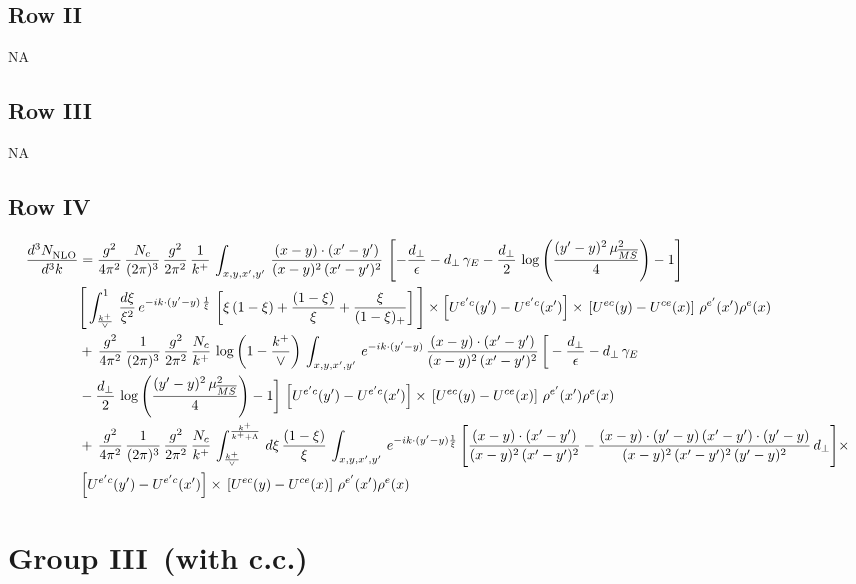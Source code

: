 \documentclass[9pt]{article}
\numberwithin{equation}{section}
\begin{document}
\subsection{Row II}
\textsc{NA}
\subsection{Row III}
\textsc{NA}
\subsection{Row IV}
\begin{align}
    \frac{d^{3}N_{\rm NLO}^{\rm}}{d^{3}k}  & = \frac{g^{2}}{4\pi^{2}}\, \frac{N_{c}}{(2\pi)^{3}}\,\frac{g^{2}}{2\pi^{2}}\, \frac{1}{k^{+}}\,\int_{x,y,x',y'}\,\frac{(x-y)\cdot (x'-y')}{(x-y)^{2}\,(x'-y')^{2}}\,\left[-\frac{d_{\perp}}{\epsilon}-d_{\perp}\,\gamma_{E}-\frac{d_{\perp}}{2}\,\log{\left(\frac{(y'-y)^{2}\,\mu^{2}_{\overline{MS}}}{4}\right)}-1\right]\,\notag \\ & \Bigg[\int_{\frac{k^{+}}{\vee}}^{1}\,\frac{d\xi}{\xi^{2}}\,e^{-ik\cdot (y'-y)\,\frac{1}{\xi}}\,\left[\xi\,(1-\xi)+\frac{(1-\xi)}{\xi}+\frac{\xi}{(1-\xi)_{+}}\right]\Bigg]\times \left[U^{e'c}(y') - U^{e'c}(x')\right] \times\, \left[U^{ec}(y) - U^{ce}(x)\right]\, \rho^{e'}(x') \rho^{e}(x)\notag \\ &  +\, \frac{g^{2}}{4\pi^{2}}\, \frac{1}{(2\pi)^{3}}\,\frac{g^{2}}{2\pi^{2}}\, \frac{N_{c}}{k^{+}}\, \log{\left(1-\frac{k^{+}}{\vee}\right)}\,\int_{x,y,x',y'}\,e^{-ik\cdot (y'-y)}\,\frac{(x-y)\cdot (x'-y')}{(x-y)^{2}\,(x'-y')^{2}}\,\bigg[-\frac{d_{\perp}}{\epsilon}-d_{\perp}\,\gamma_{E}\notag \\ & -\frac{d_{\perp}}{2}\,\log{\left(\frac{(y'-y)^{2}\,\mu^{2}_{\overline{MS}}}{4}\right)}-1\bigg]\,\left[U^{e'c}(y') - U^{e'c}(x')\right] \times\, \left[U^{ec}(y) - U^{ce}(x)\right]\, \rho^{e'}(x') \rho^{e}(x)\notag \\ & +\,\frac{g^{2}}{4\pi^{2}}\, \frac{1}{(2\pi)^{3}}\,\frac{g^{2}}{2\pi^{2}}\, \frac{N_{c}}{k^{+}}\,\int_{\frac{k^{+}}{\vee}}^{\frac{k^{+}}{k^{+}+\Lambda}}\,d\xi\, \frac{(1-\xi)}{\xi}\, \int_{x,y,x',y'}\,e^{-ik\cdot (y'-y)\frac{1}{\xi}}\,\Bigg[\frac{(x-y)\cdot (x'-y')}{(x-y)^{2}\, (x'-y')^{2}} -\frac{(x-y)\cdot (y'-y)\, (x'-y')\cdot (y'-y)}{(x-y)^{2}\,(x'-y')^{2}\,(y'-y)^{2}}\,d_{\perp}\Bigg]\times\notag \\ &  \left[U^{e'c}(y') - U^{e'c}(x')\right] \times\, \left[U^{ec}(y) - U^{ce}(x)\right]\, \rho^{e'}(x') \rho^{e}(x)
\end{align}
\section{Group III\, (with c.c.)}
\end{document}
